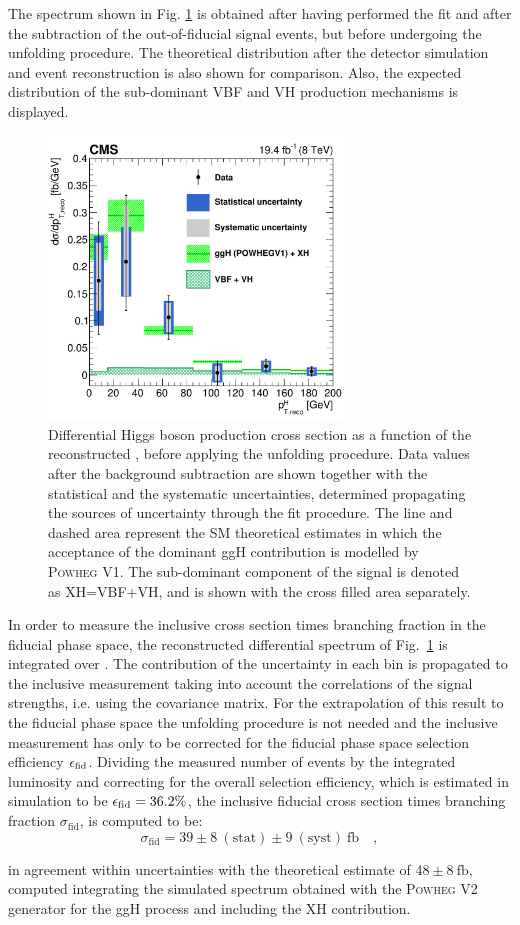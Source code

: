 The spectrum shown in Fig. \ref{fig:pre_unfolding} is obtained after having performed the fit and after the subtraction of the out-of-fiducial signal events, but before undergoing the unfolding procedure. The theoretical distribution after the detector simulation and event reconstruction is also shown for comparison. Also, the expected distribution of the sub-dominant VBF and VH production mechanisms is displayed.

\begin{figure}[htb]
\centering
\includegraphics[width=0.7\textwidth]{images/unblinding/pth_reco_paper.pdf}
\caption{Differential Higgs boson production cross section as a function of the reconstructed \pth{}, before applying the unfolding procedure. Data values after the background subtraction are shown together with the statistical and the systematic uncertainties, determined propagating the sources of uncertainty through the fit procedure. The line and dashed area represent the SM theoretical estimates in which the acceptance of the dominant ggH contribution is modelled by \textsc{Powheg V1}. The sub-dominant component of the signal is denoted as XH=VBF+VH, and is shown with the cross filled area separately.}\label{fig:pre_unfolding}
\end{figure}

In order to measure the inclusive cross section times branching fraction in the fiducial phase space, the reconstructed differential spectrum of Fig.~\ref{fig:pre_unfolding} is integrated over \pth. The contribution of the uncertainty in each bin is propagated to the inclusive measurement taking into account the correlations of the signal strengths, i.e. using the covariance matrix. For the extrapolation of this result to the fiducial phase space the unfolding procedure is not needed and the inclusive measurement has only to be corrected for the fiducial phase space selection efficiency $\epsilon_{\rm{fid}}$. Dividing the measured number of events by the integrated luminosity and correcting for the overall selection efficiency, which is estimated in simulation to be $\epsilon_{\rm{fid}} = 36.2\%$, the inclusive fiducial cross section times branching fraction $\sigma_{\mathrm{fid}}$, is computed to be:
\begin{equation}
\sigma_{\mathrm{fid}} = 39\pm 8~(\mathrm{stat}) \pm 9~(\mathrm{syst})~\mathrm{fb} \quad ,
\end{equation} 

\noindent in agreement within uncertainties with the theoretical estimate of $48 \pm 8 ~\mathrm{fb}$, computed integrating the simulated spectrum obtained with the \textsc{Powheg V2} generator for the ggH process and including the XH contribution.

